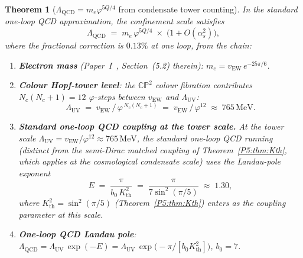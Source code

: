 \documentclass[11pt,a4paper]{article}
\newtheorem{theorem}{Theorem}[section]
\theoremstyle{definition}
\theoremstyle{remark}
\newcommand{\vp}{\varphi}
\newcommand{\vEW}{v_{\mathrm{EW}}}
\newcommand{\LUV}{\Lambda_{\mathrm{UV}}}
\newcommand{\LQCD}{\Lambda_{\mathrm{QCD}}}
\begin{document}
\begin{theorem}[$\Lambda_{\mathrm{QCD}} = m_e\vp^{5Q/4}$ from condensate tower counting]
\label{P5:thm:lqcd_proved}
In the standard one-loop QCD approximation, the confinement scale satisfies
\begin{equation}
  \boxed{\LQCD \;=\; m_e\,\vp^{5Q/4} \;\times\; \bigl(1 + O(\alpha_s^2)\bigr),}
  \label{P5:eq:lqcd_proved}
\end{equation}
where the fractional correction is $0.13\%$ at one loop, from the chain:
\begin{enumerate}[label=(\roman*),noitemsep]
\item \textbf{Electron mass} (Paper~I~\cite{Paper1}, Section~(5.2) therein):
  $m_e = \vEW\,e^{-25\pi/6}$.
\item \textbf{Colour Hopf-tower level}: the $\mathbb{CP}^2$ colour fibration
  contributes $N_c(N_c{+}1) = 12$ $\vp$-steps between $\vEW$ and $\LUV$:
  \begin{equation}
    \LUV \;=\; \vEW\,/\,\vp^{\,N_c(N_c+1)} \;=\; \vEW\,/\,\vp^{12}
    \;\approx\; 765\,\mathrm{MeV}.
    \label{P5:eq:LUV_tower}
  \end{equation}
\item \textbf{Standard one-loop QCD coupling at the tower scale.}
  At the tower scale $\LUV = \vEW/\vp^{12} \approx 765\,\mathrm{MeV}$,
  the standard one-loop QCD running~\cite{GrossWilczek1973,Politzer1973} (distinct from the semi-Dirac matched
  coupling of Theorem~\ref{P5:thm:Kth}, which applies at the cosmological
  condensate scale) uses the Landau-pole exponent
  \begin{equation}
    E \;=\; \frac{\pi}{b_0\,K_{\mathrm{th}}^2}
       \;=\; \frac{\pi}{7\sin^2(\pi/5)}
       \;\approx\; 1.30,
    \label{P5:eq:lqcd_exponent}
  \end{equation}
  where $K_{\mathrm{th}}^2 = \sin^2(\pi/5)$ (Theorem~\ref{P5:thm:Kth}) enters as
  the coupling parameter at this scale.
\item \textbf{One-loop QCD Landau pole}:
  $\LQCD = \LUV\,\exp(-E) = \LUV\,\exp\!\bigl(-\pi/[b_0 K_{\mathrm{th}}^2]\bigr)$,
  $b_0=7$.
\end{enumerate}
\end{theorem}
\end{document}
